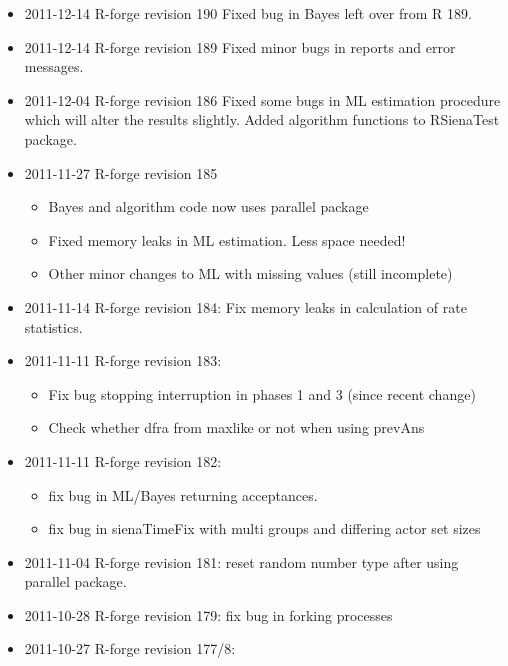 \documentclass[a4paper,fleqn,11pt]{article}
\newcommand{\+}{\, + \,}
\begin{document}
{\begin{small}
\begin{itemize}
\begin{itemize}
\item Removed endowment effect for IndTies for symmetric networks.
\item Removed code for storing change contributions on ministeps: not
  functioning
\item Set random number type to "default" at start of siena07.
\end{itemize}
\item 2011-12-14 R-forge revision 190
Fixed bug in Bayes left over from R 189.
\item 2011-12-14 R-forge revision 189
 Fixed minor bugs in reports and error messages.
\item 2011-12-04 R-forge revision 186
Fixed some bugs in ML estimation procedure which will alter the results
slightly. Added algorithm functions to RSienaTest package.
\item 2011-11-27 R-forge revision 185
\begin{itemize}
\item Bayes and algorithm code now uses parallel package
\item Fixed memory leaks in ML estimation. Less space needed!
\item Other minor changes to ML with missing values (still incomplete)
\end{itemize}
\item 2011-11-14 R-forge revision 184:
Fix memory leaks in calculation of rate statistics.
\item 2011-11-11 R-forge revision 183:
\begin{itemize}
\item Fix bug stopping interruption in phases 1 and 3 (since recent change)
\item Check whether dfra from maxlike or not when using prevAns
\end{itemize}
\item 2011-11-11 R-forge revision 182:
\begin{itemize}
\item fix bug in ML/Bayes returning
  acceptances.
\item fix bug in sienaTimeFix with multi groups and differing actor set sizes
\end{itemize}
\item 2011-11-04 R-forge revision 181: reset random number type after using
  parallel package.
\item 2011-10-28 R-forge revision 179: fix bug in forking processes
\item 2011-10-27 R-forge revision 177/8:

\end{itemize}
\end{small}}
\end{document}
